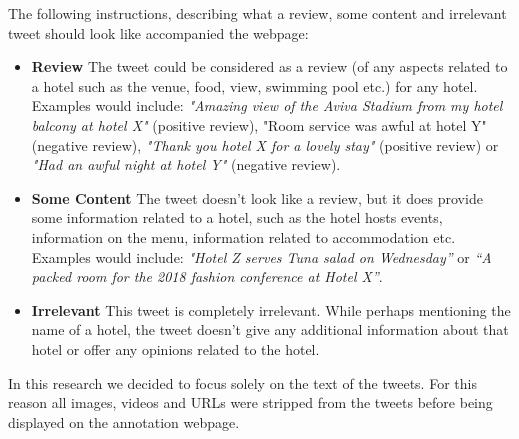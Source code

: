 The following instructions, describing what a review, some content and irrelevant tweet should look like accompanied the webpage:
\begin{itemize}
    \item \textbf{Review} \newline
    The tweet could be considered as a review (of any aspects related to a hotel such as the venue, food, view, swimming pool etc.) for any hotel. Examples would include: \emph{"Amazing view of the Aviva Stadium from my hotel balcony at hotel X"} (positive review), "Room service was awful at hotel Y" (negative review), \emph{"Thank you hotel X for a lovely stay"} (positive review) or \emph{"Had an awful night at hotel Y"} (negative review).
    \item \textbf{Some Content} \newline
    The tweet doesn't look like a review, but it does provide some information related to a hotel, such as the hotel hosts events, information on the menu, information related to accommodation etc. Examples would include: \emph{"Hotel Z serves Tuna salad on Wednesday”} or \emph{“A packed room for the 2018 fashion conference at Hotel X”}.
    \item \textbf{Irrelevant} \newline
    This tweet is completely irrelevant. While perhaps mentioning the name of a hotel, the tweet doesn't give any additional information about that hotel or offer any opinions related to the hotel.
\end{itemize}

In this research we decided to focus solely on the text of the tweets. For this reason all images, videos and URLs were stripped from the tweets before being displayed on the annotation webpage.

